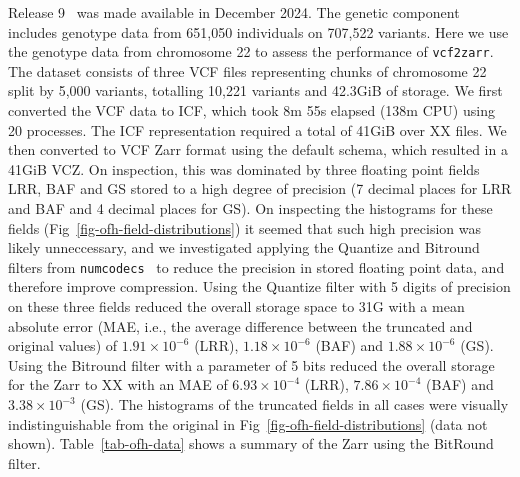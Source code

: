 \documentclass[a4paper,num-refs]{oup-contemporary}
\begin{document}
Release 9~\citep{ofhdatarelease9}
was made available in December 2024. The genetic component includes genotype data 
from 651,050 individuals on 707,522 variants. Here we use the genotype data from 
chromosome 22 to assess the performance of \texttt{vcf2zarr}. The dataset consists of
three VCF files representing chunks of chromosome 22 split by 5,000 variants, totalling 
10,221 variants and 42.3GiB of storage. We first converted the VCF 
data to ICF, which took 8m 55s elapsed (138m CPU) using 20 processes.
The ICF representation required a total of 41GiB over XX files.
We then converted to VCF Zarr format using the default schema, which resulted
in a 41GiB VCZ. On inspection, this was dominated by three floating point 
fields LRR, BAF and GS stored 
to a high degree of precision (7 decimal places for LRR and BAF and 4 decimal
places for GS).
On inspecting the histograms for these fields
(Fig~\ref{fig-ofh-field-distributions}) it seemed that such high precision
was likely unneccessary, and we investigated applying the Quantize
and Bitround filters from \texttt{numcodecs}~\citep{numcodecs}
to reduce the precision in stored floating point data, 
and therefore improve compression.
Using the Quantize filter with 5 digits of precision on these three fields reduced the 
overall storage space to 31G with a mean absolute error (MAE, i.e., the average
difference between the truncated and original values) of 
$1.91\times10^{-6}$ (LRR), 
$1.18\times10^{-6}$ (BAF)  and 
$1.88\times10^{-6}$ (GS). 
Using the Bitround filter with a parameter of 5 bits reduced the overall storage for the Zarr to
XX with an MAE of
$6.93\times10^{-4}$ (LRR), 
$7.86\times10^{-4}$ (BAF)  and 
$3.38\times10^{-3}$ (GS). 
The histograms of the truncated fields in all cases were visually indistinguishable 
from the original in Fig~\ref{fig-ofh-field-distributions} (data not shown).
Table~\ref{tab-ofh-data} shows a summary of the Zarr using the BitRound filter.
\end{document}
